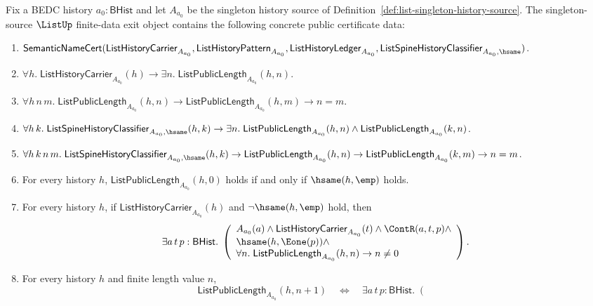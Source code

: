 \begin{theorem}
\label{thm:list-singleton-source-finite-data-exit-constructor-audit}
Fix a BEDC history $a_0:\mathsf{BHist}$ and let $A_{a_0}$ be the singleton
history source of Definition~\ref{def:list-singleton-history-source}. The
singleton-source $\ListUp$ finite-data exit object contains the following
concrete public certificate data:
\begin{enumerate}
  \item
  $\mathsf{SemanticNameCert}(\mathsf{ListHistoryCarrier}_{A_{a_0}},
  \mathsf{ListHistoryPattern}_{A_{a_0}},
  \mathsf{ListHistoryLedger}_{A_{a_0}},
  \mathsf{ListSpineHistoryClassifier}_{A_{a_0},\hsame})$.
  \item
  $\forall h.\;\mathsf{ListHistoryCarrier}_{A_{a_0}}(h)\to
  \exists n.\;\mathsf{ListPublicLength}_{A_{a_0}}(h,n)$.
  \item
  $\forall h\,n\,m.\;\mathsf{ListPublicLength}_{A_{a_0}}(h,n)\to
  \mathsf{ListPublicLength}_{A_{a_0}}(h,m)\to n=m$.
  \item
  $\forall h\,k.\;
  \mathsf{ListSpineHistoryClassifier}_{A_{a_0},\hsame}(h,k)\to
  \exists n.\;\mathsf{ListPublicLength}_{A_{a_0}}(h,n)\land
  \mathsf{ListPublicLength}_{A_{a_0}}(k,n)$.
  \item
  $\forall h\,k\,n\,m.\;
  \mathsf{ListSpineHistoryClassifier}_{A_{a_0},\hsame}(h,k)\to
  \mathsf{ListPublicLength}_{A_{a_0}}(h,n)\to
  \mathsf{ListPublicLength}_{A_{a_0}}(k,m)\to n=m$.
  \item
  For every history $h$, $\mathsf{ListPublicLength}_{A_{a_0}}(h,0)$ holds if
  and only if $\hsame(h,\emp)$ holds.
  \item
  For every history $h$, if $\mathsf{ListHistoryCarrier}_{A_{a_0}}(h)$ and
  $\neg\hsame(h,\emp)$ hold, then
  $$
  \exists a\,t\,p:\mathsf{BHist}.\;
  \left(
  \begin{array}{l}
  A_{a_0}(a)\land \mathsf{ListHistoryCarrier}_{A_{a_0}}(t)\land
  \ContR(a,t,p)\land\\
  \hsame(h,\Eone(p))\land\\
  \forall n.\;\mathsf{ListPublicLength}_{A_{a_0}}(h,n)\to n\neq 0
  \end{array}
  \right).
  $$
  \item
  For every history $h$ and finite length value $n$,
  $$
  \mathsf{ListPublicLength}_{A_{a_0}}(h,n+1)
  \quad\Longleftrightarrow\quad
  \exists a\,t\,p:\mathsf{BHist}.\;
  \left(
  \begin{array}{l}

\end{array}$$
\end{enumerate}
\end{theorem}
